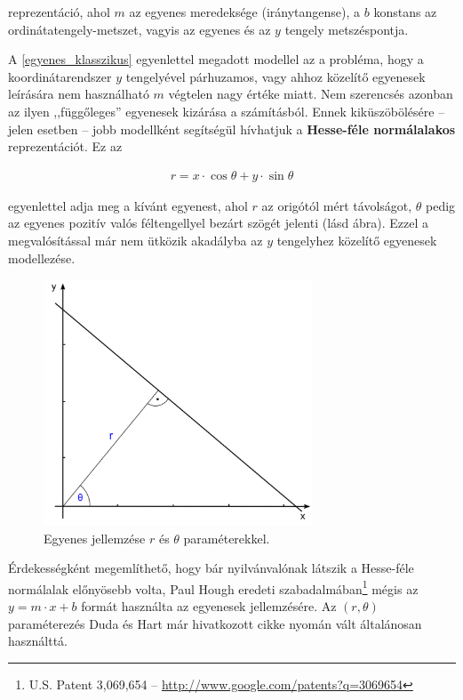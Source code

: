 reprezentáció, ahol $ m $ az egyenes meredeksége (iránytangense), a $ b $ konstans az ordinátatengely-metszet, vagyis az egyenes és az $ y $ tengely metszéspontja.

A \eqref{egyenes_klasszikus} egyenlettel megadott modellel az a probléma, hogy a koordinátarendszer $ y $ tengelyével párhuzamos, vagy ahhoz közelítő egyenesek leírására nem használható $ m $ végtelen nagy értéke miatt. Nem szerencsés azonban az ilyen ,,függőleges'' egyenesek kizárása a számításból. Ennek kiküszöbölésére -- jelen esetben -- jobb modellként segítségül hívhatjuk a \textbf{Hesse-féle normálalakos} reprezentációt. Ez az

\begin{align}\label{eq:egyenes_hesse}
r = x \cdot \cos \theta + y \cdot \sin \theta
\end{align}

egyenlettel adja meg a kívánt egyenest, ahol $ r $ az origótól mért távolságot, $ \theta $ pedig az egyenes pozitív valós féltengellyel bezárt szögét jelenti (lásd  ábra). Ezzel a megvalósítással már nem ütközik akadályba az $ y $ tengelyhez közelítő egyenesek modellezése.

\begin{figure}[!ht]
\centering
\includegraphics[width=80mm, keepaspectratio]{figures/repr_line.png}
\caption{Egyenes jellemzése $ r $ és $ \theta $ paraméterekkel.}
\label{fig:repr_line}
\end{figure}

\bigskip

Érdekességként megemlíthető, hogy bár nyilvánvalónak látszik a Hesse-féle normálalak előnyösebb volta, Paul Hough eredeti szabadalmában\footnote{U.S. Patent 3,069,654 -- \url{http://www.google.com/patents?q=3069654}} mégis az $ y = m \cdot x + b $ formát használta az egyenesek jellemzésére. Az $ (r, \theta) $ paraméterezés Duda és Hart már hivatkozott cikke nyomán vált általánosan használttá. \cite{hough_duda}

